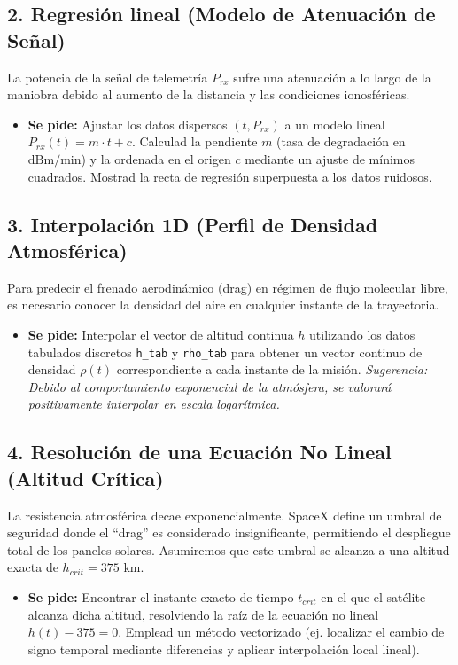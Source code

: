 	\subsection*{2. Regresión lineal (Modelo de Atenuación de Señal)}
	La potencia de la señal de telemetría $P_{rx}$ sufre una atenuación a lo largo de la maniobra debido al aumento de la distancia y las condiciones ionosféricas.
	
	\begin{itemize}
		\item \textbf{Se pide:} Ajustar los datos dispersos $(t, P_{rx})$ a un modelo lineal $P_{rx}(t) = m \cdot t + c$. Calculad la pendiente $m$ (tasa de degradación en $\text{dBm/min}$) y la ordenada en el origen $c$ mediante un ajuste de mínimos cuadrados. Mostrad la recta de regresión superpuesta a los datos ruidosos.
	\end{itemize}
	
	\subsection*{3. Interpolación 1D (Perfil de Densidad Atmosférica)}
	Para predecir el frenado aerodinámico (drag) en régimen de flujo molecular libre, es necesario conocer la densidad del aire en cualquier instante de la trayectoria.
	
	\begin{itemize}
		\item \textbf{Se pide:} Interpolar el vector de altitud continua $h$ utilizando los datos tabulados discretos \texttt{h\_tab} y \texttt{rho\_tab} para obtener un vector continuo de densidad $\rho(t)$ correspondiente a cada instante de la misión. \textit{Sugerencia: Debido al comportamiento exponencial de la atmósfera, se valorará positivamente interpolar en escala logarítmica.}
	\end{itemize}
	
	\subsection*{4. Resolución de una Ecuación No Lineal (Altitud Crítica)}
	La resistencia atmosférica decae exponencialmente. SpaceX define un umbral de seguridad donde el ``drag'' es considerado insignificante, permitiendo el despliegue total de los paneles solares. Asumiremos que este umbral se alcanza a una altitud exacta de $h_{crit} = 375 \text{ km}$.
	
	\begin{itemize}
		\item \textbf{Se pide:} Encontrar el instante exacto de tiempo $t_{crit}$ en el que el satélite alcanza dicha altitud, resolviendo la raíz de la ecuación no lineal $h(t) - 375 = 0$. Emplead un método vectorizado (ej. localizar el cambio de signo temporal mediante diferencias y aplicar interpolación local lineal).
	\end{itemize}
	
